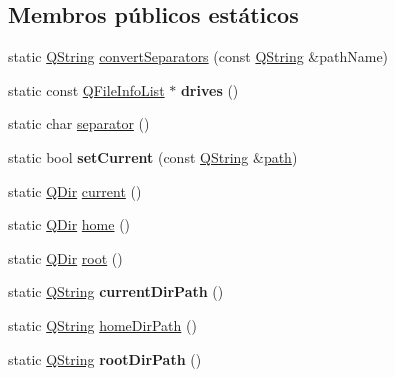 \subsection*{Membros públicos estáticos}
\begin{DoxyCompactItemize}
\item 
static \hyperlink{class_q_string}{Q\-String} \hyperlink{class_q_dir_afbdfe81a3dbef9637c37fb9455d1ffcc}{convert\-Separators} (const \hyperlink{class_q_string}{Q\-String} \&path\-Name)
\item 
\hypertarget{class_q_dir_aa2e73a1b51c4db7b9a18fdd407f485b1}{static const \hyperlink{class_q_list}{Q\-File\-Info\-List} $\ast$ {\bfseries drives} ()}\label{class_q_dir_aa2e73a1b51c4db7b9a18fdd407f485b1}

\item 
static char \hyperlink{class_q_dir_a5be6dd0988dcb207e512241b82d5dcfd}{separator} ()
\item 
\hypertarget{class_q_dir_aa119df838eef033593c6293fe704ff4e}{static bool {\bfseries set\-Current} (const \hyperlink{class_q_string}{Q\-String} \&\hyperlink{class_q_dir_abef507bc8e9b061531a77dc84e991255}{path})}\label{class_q_dir_aa119df838eef033593c6293fe704ff4e}

\item 
static \hyperlink{class_q_dir}{Q\-Dir} \hyperlink{class_q_dir_a1050f05c18394b424efe759f5306a389}{current} ()
\item 
static \hyperlink{class_q_dir}{Q\-Dir} \hyperlink{class_q_dir_aaab36122db9259296c1a1e4c0c47ad4c}{home} ()
\item 
static \hyperlink{class_q_dir}{Q\-Dir} \hyperlink{class_q_dir_a6affbb3c1c91145c6daa130d5c45ebe6}{root} ()
\item 
\hypertarget{class_q_dir_af51df33280d66ef9b2764d56c4a9fce4}{static \hyperlink{class_q_string}{Q\-String} {\bfseries current\-Dir\-Path} ()}\label{class_q_dir_af51df33280d66ef9b2764d56c4a9fce4}

\item 
static \hyperlink{class_q_string}{Q\-String} \hyperlink{class_q_dir_a15b58f0bf61cb8ffd19faa599fefde1b}{home\-Dir\-Path} ()
\item 
\hypertarget{class_q_dir_abaeb0aa1b8d3411c119ecedd5be584c5}{static \hyperlink{class_q_string}{Q\-String} {\bfseries root\-Dir\-Path} ()}\label{class_q_dir_abaeb0aa1b8d3411c119ecedd5be584c5}


\end{DoxyCompactItemize}
